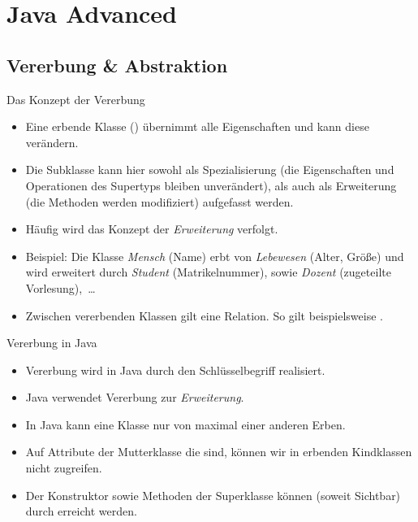 
\section{Java Advanced}

\subsection{Vererbung \& Abstraktion}

\begin{frame}{Das Konzept der Vererbung}
    \hypertarget<1>{mrk:Vererbung}{}%
    \begin{itemize}[<+(1)->]
        \item Eine erbende Klasse () übernimmt alle Eigenschaften und kann diese verändern.
        \item Die Subklasse kann hier sowohl als Spezialisierung (die Eigenschaften und Operationen des Supertyps bleiben unverändert),\pause{} als auch als Erweiterung (die Methoden werden modifiziert) aufgefasst werden.
        \item Häufig wird das Konzept der \emph{Erweiterung} verfolgt.
        \item Beispiel: Die Klasse \emph{Mensch} (Name) erbt von \emph{Lebewesen} (Alter, Größe) und\pause{} wird erweitert durch \emph{Student} (Matrikelnummer), sowie \emph{Dozent} (zugeteilte Vorlesung),~\ldots
        \item Zwischen vererbenden Klassen gilt eine  Relation.\pause{} So gilt beispielsweise .
    \end{itemize}
\end{frame}

\begin{frame}{Vererbung in Java}
    \begin{itemize}[<+(1)->]
        \widei
        \item Vererbung wird in Java durch den Schlüsselbegriff  realisiert.
        \item Java verwendet Vererbung zur \emph{Erweiterung}.
        \item In Java kann eine Klasse nur von maximal einer anderen Erben.
        \item Auf Attribute der Mutterklasse die  sind,\pause{} können wir in erbenden Kindklassen nicht zugreifen.
        \item Der Konstruktor sowie Methoden der Superklasse können (soweit Sichtbar) durch  erreicht werden.
    \end{itemize}
\end{frame}

